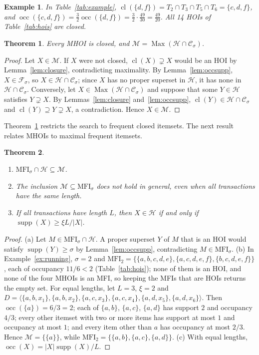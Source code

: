 \documentclass[pdflatex,sn-mathphys,Numbered]{sn-jnl}
\theoremstyle{thmstyleone}
\newtheorem{theorem}{Theorem}
\theoremstyle{thmstyletwo}
\newtheorem{example}{Example}
\theoremstyle{thmstylethree}
\newcommand{\supp}{\operatorname{supp}}
\newcommand{\occ}{\operatorname{occ}}
\newcommand{\cl}{\operatorname{cl}}
\newcommand{\HOI}{\mathcal{H}}
\newcommand{\MHOI}{\mathcal{M}}
\newcommand{\FI}{\mathcal{F}}
\newcommand{\FCI}{\mathcal{C}}
\newcommand{\MFI}{\mathrm{MFI}}
\newcommand{\Max}{\operatorname{Max}}
\begin{document}
\begin{example}\label{ex:closure}
In Table~\ref{tab:example}, $\cl(\{d,f\}) = T_2 \cap T_3 \cap T_5 \cap T_6 = \{c,d,f\}$, and $\occ(\{c,d,f\}) = \frac32 \occ(\{d,f\}) = \frac32 \cdot \frac{49}{30} = \frac{49}{20}$. All 14 HOIs of Table~\ref{tab:hois} are closed.
\end{example}

\begin{theorem}\label{thm:maxclosed}
Every MHOI is closed, and $\MHOI = \Max(\HOI \cap \FCI_\sigma)$.
\end{theorem}
\begin{proof}
Let $X \in \MHOI$. If $X$ were not closed, $\cl(X) \supsetneq X$ would be an HOI by Lemma~\ref{lem:closure}, contradicting maximality. By Lemma~\ref{lem:occsupp}, $X \in \FI_\sigma$, so $X \in \HOI \cap \FCI_\sigma$; since $X$ has no proper superset in $\HOI$, it has none in $\HOI \cap \FCI_\sigma$.
Conversely, let $X \in \Max(\HOI \cap \FCI_\sigma)$ and suppose that some $Y \in \HOI$ satisfies $Y \supsetneq X$. By Lemmas~\ref{lem:closure} and~\ref{lem:occsupp}, $\cl(Y) \in \HOI \cap \FCI_\sigma$ and $\cl(Y) \supseteq Y \supsetneq X$, a contradiction. Hence $X \in \MHOI$.
\end{proof}

Theorem~\ref{thm:maxclosed} restricts the search to frequent closed itemsets. The next result relates MHOIs to maximal frequent itemsets.

\begin{theorem}\label{thm:mfi}
\begin{enumerate}
\item[(a)] $\MFI_\sigma \cap \HOI \subseteq \MHOI$.
\item[(b)] The inclusion $\MHOI \subseteq \MFI_\sigma$ does not hold in general, even when all transactions have the same length.
\item[(c)] If all transactions have length $L$, then $X \in \HOI$ if and only if $\supp(X) \ge \xi L / |X|$.
\end{enumerate}
\end{theorem}
\begin{proof}
(a) Let $M \in \MFI_\sigma \cap \HOI$. A proper superset $Y$ of $M$ that is an HOI would satisfy $\supp(Y) \ge \sigma$ by Lemma~\ref{lem:occsupp}, contradicting $M \in \MFI_\sigma$.
(b) In Example~\ref{ex:running}, $\sigma = 2$ and $\MFI_2 = \{\{a,b,c,d,e\}, \{a,c,d,e,f\}, \{b,c,d,e,f\}\}$, each of occupancy $11/6 < 2$ (Table~\ref{tab:hois}); none of them is an HOI, and none of the four MHOIs is an MFI, so keeping the MFIs that are HOIs returns the empty set. For equal lengths, let $L = 3$, $\xi = 2$ and $D = \langle \{a,b,x_1\}, \{a,b,x_2\}, \{a,c,x_3\}, \{a,c,x_4\}, \{a,d,x_5\}, \{a,d,x_6\} \rangle$. Then $\occ(\{a\}) = 6/3 = 2$; each of $\{a,b\}$, $\{a,c\}$, $\{a,d\}$ has support $2$ and occupancy $4/3$; every other itemset with two or more items has support at most $1$ and occupancy at most $1$; and every item other than $a$ has occupancy at most $2/3$. Hence $\MHOI = \{\{a\}\}$, while $\MFI_2 = \{\{a,b\}, \{a,c\}, \{a,d\}\}$.
(c) With equal lengths, $\occ(X) = |X| \supp(X) / L$.
\end{proof}
\end{document}
